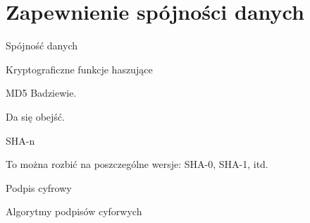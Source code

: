 \section{Zapewnienie spójności danych}

\begin{frame}{Spójność danych}

\end{frame}

\begin{frame}{Kryptograficzne funkcje haszujące}
	
\end{frame}

\begin{frame}{MD5}
	Badziewie.
	
	Da się obejść.
\end{frame}

\begin{frame}{SHA-n}
	
	To można rozbić na poszczególne wersje: SHA-0, SHA-1, itd.
\end{frame}


\begin{frame}{Podpis cyfrowy}
	
\end{frame}

\begin{frame}{Algorytmy podpisów cyforwych}
	
\end{frame}